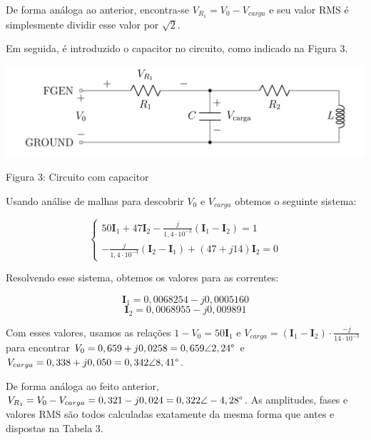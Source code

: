 \documentclass[a4 paper]{article}
\begin{document}
De forma análoga ao anterior, encontra-se $V_{R_1}=V_0-V_{carga}$ e seu valor RMS é simplesmente dividir esse valor por $\sqrt{2}$.

\vspace{1cm}


\vspace{1cm}
Em seguida, é introduzido o capacitor no circuito, como indicado na Figura 3. 

\vspace{3cm}
\begin{table}[h]
\centering
\includegraphics[scale=0.5]{figuras/figura2}
\end{table}

\begin{center}
Figura 3: Circuito com capacitor 
\end{center}

Usando análise de malhas para descobrir $V_0$ e $V_{carga}$ obtemos o seguinte sistema:

\begin{equation*}
\left\{
\begin{aligned}
50\textbf{I}_1+47\textbf{I}_2-\frac{j}{1,4\cdot10^{-3}}(\textbf{I}_1-\textbf{I}_2)=1\\
-\frac{j}{1,4\cdot10^{-3}}(\textbf{I}_2-\textbf{I}_1)+(47+j14)\textbf{I}_2=0
\end{aligned}\right.
\end{equation*}

Resolvendo esse sistema, obtemos os valores para as correntes:

\[\textbf{I}_1=0,0068254-j0,0005160\]
\[\textbf{I}_2=0,0068955-j0,009891\]


Com esses valores, usamos as relações $1-V_0=50\textbf{I}_1$ e $V_{carga}=(\textbf{I}_1-\textbf{I}_2)\cdot\frac{-j}{14\cdot10^{-3}}$ para encontrar $V_0=0,659+j0,0258=0,659\angle2,24\text{\textdegree}$ e $V_{carga}=0,338+j0,050=0,342\angle8,41\text{\textdegree}$.

De forma análoga ao feito anterior, $V_{R_1}=V_0-V_{carga}=0,321-j0,024=0,322\angle-4,28\text{\textdegree}$. As amplitudes, fases e valores RMS são todos calculadas exatamente da mesma forma que antes e dispostas na Tabela 3.
\end{document}
